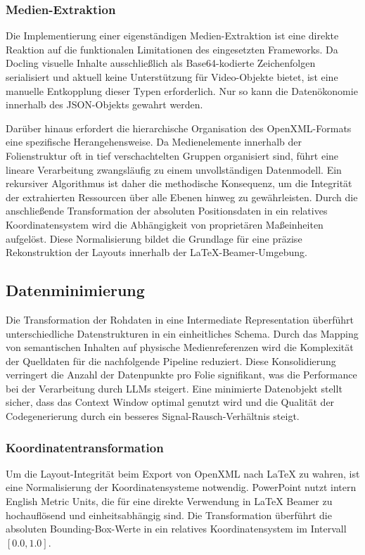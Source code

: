 \documentclass[a4paper]{article}
\begin{document}
\subsubsection{Medien-Extraktion}

Die Implementierung einer eigenständigen Medien-Extraktion ist eine direkte Reaktion auf die funktionalen Limitationen des eingesetzten Frameworks. Da Docling visuelle Inhalte ausschließlich als Base64-kodierte Zeichenfolgen serialisiert und aktuell keine Unterstützung für Video-Objekte bietet, ist eine manuelle Entkopplung dieser Typen erforderlich. Nur so kann die Datenökonomie innerhalb des JSON-Objekts gewahrt werden.

Darüber hinaus erfordert die hierarchische Organisation des OpenXML-Formats eine spezifische Herangehensweise. Da Medienelemente innerhalb der Folienstruktur oft in tief verschachtelten Gruppen organisiert sind, führt eine lineare Verarbeitung zwangsläufig zu einem unvollständigen Datenmodell. Ein rekursiver Algorithmus ist daher die methodische Konsequenz, um die Integrität der extrahierten Ressourcen über alle Ebenen hinweg zu gewährleisten. Durch die anschließende Transformation der absoluten Positionsdaten in ein relatives Koordinatensystem wird die Abhängigkeit von proprietären Maßeinheiten aufgelöst. Diese Normalisierung bildet die Grundlage für eine präzise Rekonstruktion der Layouts innerhalb der LaTeX-Beamer-Umgebung.
\subsection{Datenminimierung}

Die Transformation der Rohdaten in eine Intermediate Representation überführt unterschiedliche Datenstrukturen in ein einheitliches Schema. Durch das Mapping von semantischen Inhalten auf physische Medienreferenzen wird die Komplexität der Quelldaten für die nachfolgende Pipeline reduziert. Diese Konsolidierung verringert die Anzahl der Datenpunkte pro Folie signifikant, was die Performance bei der Verarbeitung durch LLMs steigert. Eine minimierte Datenobjekt stellt sicher, dass das Context Window optimal genutzt wird und die Qualität der Codegenerierung durch ein besseres Signal-Rausch-Verhältnis steigt.
\subsubsection{Koordinatentransformation}
Um die Layout-Integrität beim Export von OpenXML nach LaTeX zu wahren, ist eine Normalisierung der Koordinatensysteme notwendig. PowerPoint nutzt intern English Metric Units, die für eine direkte Verwendung in LaTeX Beamer zu hochauflösend und einheitsabhängig sind. Die Transformation überführt die absoluten Bounding-Box-Werte in ein relatives Koordinatensystem im Intervall $[0.0, 1.0]$.
\end{document}
